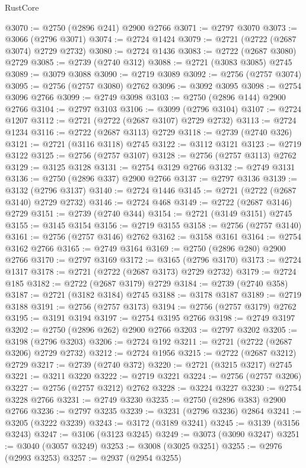 \begin{lexlean}{RustCore}
\begin{coremodule}
@3070 := @2750 (@2896 @241) @2900 @2766
@3071 := @2797 @3070
@3073 := @3066 (@2796 @3071)
@3074 := @2724 @1424
@3079 := @2721 (@2722 (@2687 @3074) @2729 @2732)
@3080 := @2724 @1436
@3083 := @2722 (@2687 @3080) @2729
@3085 := @2739 (@2740 @312)
@3088 := @2721 (@3083 @3085) @2745
@3089 := @3079 @3088
@3090 := @2719 @3089
@3092 := @2756 (@2757 @3074)
@3095 := @2756 (@2757 @3080) @2762
@3096 := @3092 @3095
@3098 := @2754 @3096 @2766
@3099 := @2749 @3098
@3103 := @2750 (@2896 @144) @2900 @2766
@3104 := @2797 @3103
@3106 := @3099 (@2796 @3104)
@3107 := @2724 @1207
@3112 := @2721 (@2722 (@2687 @3107) @2729 @2732)
@3113 := @2724 @1234
@3116 := @2722 (@2687 @3113) @2729
@3118 := @2739 (@2740 @326)
@3121 := @2721 (@3116 @3118) @2745
@3122 := @3112 @3121
@3123 := @2719 @3122
@3125 := @2756 (@2757 @3107)
@3128 := @2756 (@2757 @3113) @2762
@3129 := @3125 @3128
@3131 := @2754 @3129 @2766
@3132 := @2749 @3131
@3136 := @2750 (@2896 @337) @2900 @2766
@3137 := @2797 @3136
@3139 := @3132 (@2796 @3137)
@3140 := @2724 @1446
@3145 := @2721 (@2722 (@2687 @3140) @2729 @2732)
@3146 := @2724 @468
@3149 := @2722 (@2687 @3146) @2729
@3151 := @2739 (@2740 @344)
@3154 := @2721 (@3149 @3151) @2745
@3155 := @3145 @3154
@3156 := @2719 @3155
@3158 := @2756 (@2757 @3140)
@3161 := @2756 (@2757 @3146) @2762
@3162 := @3158 @3161
@3164 := @2754 @3162 @2766
@3165 := @2749 @3164
@3169 := @2750 (@2896 @280) @2900 @2766
@3170 := @2797 @3169
@3172 := @3165 (@2796 @3170)
@3173 := @2724 @1317
@3178 := @2721 (@2722 (@2687 @3173) @2729 @2732)
@3179 := @2724 @185
@3182 := @2722 (@2687 @3179) @2729
@3184 := @2739 (@2740 @358)
@3187 := @2721 (@3182 @3184) @2745
@3188 := @3178 @3187
@3189 := @2719 @3188
@3191 := @2756 (@2757 @3173)
@3194 := @2756 (@2757 @3179) @2762
@3195 := @3191 @3194
@3197 := @2754 @3195 @2766
@3198 := @2749 @3197
@3202 := @2750 (@2896 @262) @2900 @2766
@3203 := @2797 @3202
@3205 := @3198 (@2796 @3203)
@3206 := @2724 @192
@3211 := @2721 (@2722 (@2687 @3206) @2729 @2732)
@3212 := @2724 @1956
@3215 := @2722 (@2687 @3212) @2729
@3217 := @2739 (@2740 @372)
@3220 := @2721 (@3215 @3217) @2745
@3221 := @3211 @3220
@3222 := @2719 @3221
@3224 := @2756 (@2757 @3206)
@3227 := @2756 (@2757 @3212) @2762
@3228 := @3224 @3227
@3230 := @2754 @3228 @2766
@3231 := @2749 @3230
@3235 := @2750 (@2896 @383) @2900 @2766
@3236 := @2797 @3235
@3239 := @3231 (@2796 @3236) @2864
@3241 := @3205 (@3222 @3239)
@3243 := @3172 (@3189 @3241)
@3245 := @3139 (@3156 @3243)
@3247 := @3106 (@3123 @3245)
@3249 := @3073 (@3090 @3247)
@3251 := @3040 (@3057 @3249)
@3253 := @3008 (@3025 @3251)
@3255 := @2976 (@2993 @3253)
@3257 := @2937 (@2954 @3255)

\end{coremodule}
\end{lexlean}
